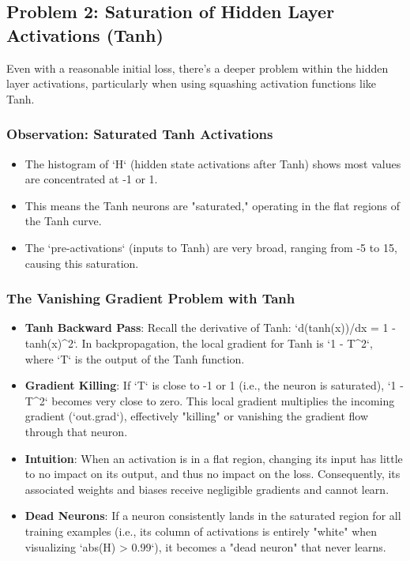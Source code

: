 \subsection{Problem 2: Saturation of Hidden Layer Activations (Tanh)}

Even with a reasonable initial loss, there's a deeper problem within the hidden layer activations, particularly when using squashing activation functions like Tanh.

\subsubsection{Observation: Saturated Tanh Activations}
\begin{itemize}
    \item The histogram of `H` (hidden state activations after Tanh) shows most values are concentrated at -1 or 1.
    \item This means the Tanh neurons are "saturated," operating in the flat regions of the Tanh curve.
    \item The `pre-activations` (inputs to Tanh) are very broad, ranging from -5 to 15, causing this saturation.
\end{itemize}

\subsubsection{The Vanishing Gradient Problem with Tanh}
\begin{itemize}
    \item \textbf{Tanh Backward Pass}: Recall the derivative of Tanh: `d(tanh(x))/dx = 1 - tanh(x)^2`. In backpropagation, the local gradient for Tanh is `1 - T^2`, where `T` is the output of the Tanh function.
    \item \textbf{Gradient Killing}: If `T` is close to -1 or 1 (i.e., the neuron is saturated), `1 - T^2` becomes very close to zero. This local gradient multiplies the incoming gradient (`out.grad`), effectively "killing" or vanishing the gradient flow through that neuron.
    \item \textbf{Intuition}: When an activation is in a flat region, changing its input has little to no impact on its output, and thus no impact on the loss. Consequently, its associated weights and biases receive negligible gradients and cannot learn.
    \item \textbf{Dead Neurons}: If a neuron consistently lands in the saturated region for all training examples (i.e., its column of activations is entirely "white" when visualizing `abs(H) > 0.99`), it becomes a "dead neuron" that never learns.
\end{itemize}

